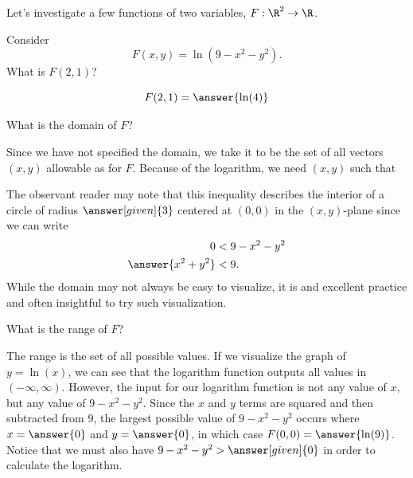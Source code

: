 \documentclass{ximera}
\newcommand{\point}[1]{\left(#1\right)} %
\begin{document}
Let's investigate a few functions of two variables, $F:\R^2\to\R$.

\begin{question}
  Consider
  \[
  F(x,y) = \ln(9-x^2-y^2).
  \]
  What is $F(2,1)$?
  \begin{prompt}
    \[
    F(2,1) = \answer{\ln(4)}
    \]
  \end{prompt}
  \begin{question}
    What is the domain of $F$?
    \begin{prompt}
      Since we have not specified the domain, we take it to be the set of all vectors $\point{x,y}$ allowable as
       for $F$.
      Because of the logarithm, we need $\point{x,y}$ such that 
      
      The observant reader may note that this inequality
      describes the interior of a circle of radius $\answer[given]{3}$
      centered at $(0,0)$ in the $(x,y)$-plane since we can write
      \begin{align*}
        0 & < 9-x^2-y^2 \\
        \answer{x^2+y^2} &< 9.
      \end{align*}
      While the domain may not always be easy to visualize, it is
      and excellent practice and often insightful to try such visualization.
      
    \end{prompt}
    \begin{question}
      What is the range of $F$?
      \begin{prompt}
        The range is the set of all possible
         values.  If we visualize 
        the graph of $y = \ln(x)$, we can see that the logarithm function outputs all 
        values in $(-\infty, \infty)$.  However, the input for our logarithm function is 
        not any value of $x$, but any value of $9 - x^2 - y^2$. Since 
        the $x$ and $y$ terms are squared and then subtracted from $9$, the 
        largest possible value of $9-x^2-y^2$ occurs where $x=\answer{0}$ and
        $y=\answer{0}$, in which case $F(0,0) = \answer{\ln(9)}$.  Notice that 
        we must also have $9-x^2-y^2 > \answer[given]{0}$ in order to calculate the 
        logarithm.
        

\end{prompt}
\end{question}
\end{question}
\end{question}
\end{document}

